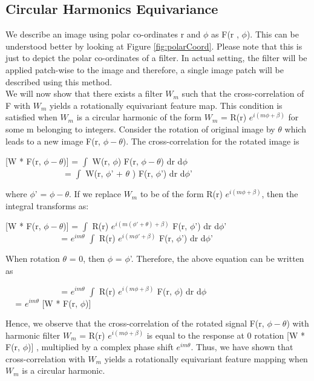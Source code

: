 \documentclass{article}
\begin{document}
\subsection{Circular Harmonics Equivariance}
We describe an image using polar co-ordinates r and $\phi$ as F(r , $\phi$). This can be understood better by looking at Figure \ref{fig:polarCoord}. Please note that this is just to depict the polar co-ordinates of a filter. In actual setting, the filter will be applied patch-wise to the image and therefore, a single image patch will be described using this method. \\
We will now show that there exists a filter $W_m$ such that the cross-correlation of F with $W_m$ yields a rotationally equivariant feature map. This condition is satisfied when $W_m$ is a circular harmonic of the form $W_m$ = R(r) $e^{i(m \phi + \beta)}$ for some m belonging to integers. Consider the rotation of original image by $\theta$ which leads to a new image F(r, $\phi - \theta$). The cross-correlation for the rotated image is

\vspace{-0.1cm}
\begin{center} 
[W * F(r, $\phi - \theta$)] = $\int$ W(r, $\phi$) F(r, $\phi - \theta$) dr d$\phi$ \\ \vspace{0.1cm}
$\hspace{80pt}$ = $\int$ W(r, $\phi$' + $\theta$ ) F(r, $\phi$') dr d$\phi$'
\end{center}
where $\phi$' = $\phi - \theta$. If we replace $W_m$ to be of the form R(r) $e^{i(m \phi + \beta)}$, then the integral transforms as:
\vspace{-0.1cm}
\begin{center} 
[W * F(r, $\phi - \theta$)] = $\int$ R(r) $e^{i(m (\phi' + \theta) + \beta)}$ F(r, $\phi$') dr d$\phi$' \\ \vspace{0.1cm}
$\hspace{75pt}$ = $e^{i m \theta}$ $\int$ R(r) $e^{i(m \phi' + \beta)}$ F(r, $\phi$') dr d$\phi$'
\end{center}
When rotation $\theta$ = 0, then $\phi$ = $\phi$'. Therefore, the above equation can be written as
\vspace{-0.1cm}
\begin{center} 
$\hspace{75pt}$ = $e^{i m \theta}$ $\int$ R(r) $e^{i(m \phi + \beta)}$ F(r, $\phi$) dr d$\phi$ \\ \vspace{0.1cm}
$\hspace{10pt}$ = $e^{i m \theta}$ [W * F(r, $\phi$)] 
\end{center}
Hence, we observe that the cross-correlation of the rotated signal F(r, $\phi - \theta$) with harmonic filter $W_m$ = R(r) $e^{i(m \phi + \beta)}$ is equal to the response at 0 rotation [W * F(r, $\phi$)] , multiplied by a complex phase shift $e^{i m \theta}$. Thus, we have shown that cross-correlation with $W_m$ yields a rotationally equivariant feature mapping when $W_m$ is a circular harmonic. 
\end{document}
